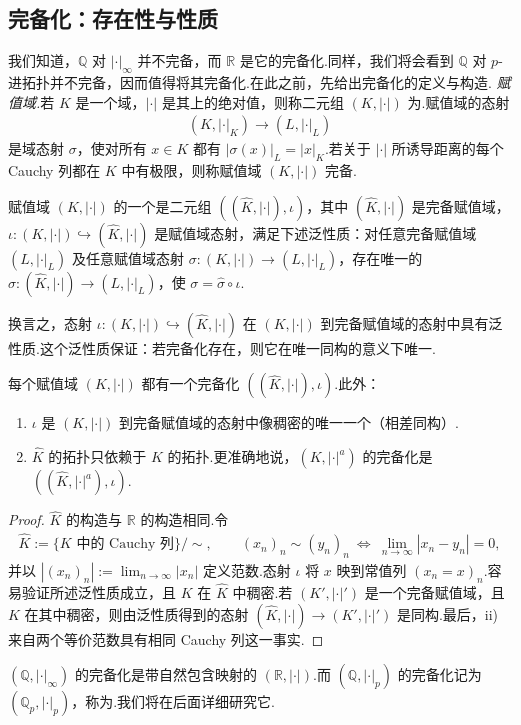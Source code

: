 \subsection{完备化：存在性与性质}\label{sec:nt-4-1-4}
我们知道，$\mathbb Q$ 对 $|\cdot|_\infty$ 并不完备，而 $\mathbb R$ 是它的完备化.同样，我们将会看到 $\mathbb Q$ 对 $p$-进拓扑并不完备，因而值得将其完备化.在此之前，先给出完备化的定义与构造.
\emph{赋值域.}若 $K$ 是一个域，$|\cdot|$ 是其上的绝对值，则称二元组 $(K,|\cdot|)$ 为.赋值域的态射
\begin{align*}
(K,|\cdot|_K)\longrightarrow(L,|\cdot|_L)
\end{align*}
是域态射 $\sigma$，使对所有 $x\in K$ 都有 $|\sigma(x)|_L=|x|_K$.若关于 $|\cdot|$ 所诱导距离的每个 Cauchy 列都在 $K$ 中有极限，则称赋值域 $(K,|\cdot|)$ 完备.
\begin{definition*}
赋值域 $(K,|\cdot|)$ 的一个是二元组 $((\widehat K,|\cdot|),\iota)$，其中 $(\widehat K,|\cdot|)$ 是完备赋值域，$\iota\colon(K,|\cdot|)\hookrightarrow(\widehat K,|\cdot|)$ 是赋值域态射，满足下述泛性质：对任意完备赋值域 $(L,|\cdot|_L)$ 及任意赋值域态射 $\sigma\colon(K,|\cdot|)\longrightarrow(L,|\cdot|_L)$，存在唯一的 $\widehat\sigma\colon(\widehat K,|\cdot|)\longrightarrow(L,|\cdot|_L)$，使 $\sigma=\widehat\sigma\circ\iota$.
\end{definition*}
换言之，态射 $\iota\colon(K,|\cdot|)\hookrightarrow(\widehat K,|\cdot|)$ 在 $(K,|\cdot|)$ 到完备赋值域的态射中具有泛性质.这个泛性质保证：若完备化存在，则它在唯一同构的意义下唯一.
\begin{proposition*}
每个赋值域 $(K,|\cdot|)$ 都有一个完备化 $((\widehat K,|\cdot|),\iota)$.此外：
\begin{enumerate}[label=\roman*)]
\item $\iota$ 是 $(K,|\cdot|)$ 到完备赋值域的态射中像稠密的唯一一个（相差同构）.
\item $\widehat K$ 的拓扑只依赖于 $K$ 的拓扑.更准确地说，$(K,|\cdot|^a)$ 的完备化是 $((\widehat K,|\cdot|^a),\iota)$.
\end{enumerate}
\end{proposition*}
\begin{proof}
$\widehat K$ 的构造与 $\mathbb R$ 的构造相同.令
\begin{align*}
\widehat K:=\{K\text{ 中的 Cauchy 列}\}/{\sim},\qquad
(x_n)_n\sim(y_n)_n\ \Longleftrightarrow\ \lim_{n\to\infty}|x_n-y_n|=0,
\end{align*}
并以 $|(x_n)_n|:=\lim_{n\to\infty}|x_n|$ 定义范数.态射 $\iota$ 将 $x$ 映到常值列 $(x_n=x)_n$.容易验证所述泛性质成立，且 $K$ 在 $\widehat K$ 中稠密.若 $(K',|\cdot|')$ 是一个完备赋值域，且 $K$ 在其中稠密，则由泛性质得到的态射 $(\widehat K,|\cdot|)\longrightarrow(K',|\cdot|')$ 是同构.最后，ii) 来自两个等价范数具有相同 Cauchy 列这一事实.
\end{proof}
\begin{example*}
$(\mathbb Q,|\cdot|_\infty)$ 的完备化是带自然包含映射的 $(\mathbb R,|\cdot|)$.而 $(\mathbb Q,|\cdot|_p)$ 的完备化记为 $(\mathbb Q_p,|\cdot|_p)$，称为.我们将在后面详细研究它.
\end{example*}
